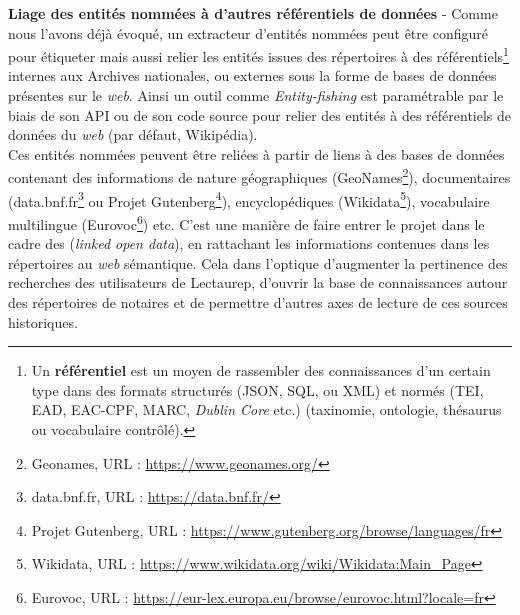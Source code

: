 \bigskip
\textbf{Liage des entités nommées à d'autres référentiels de données} - Comme nous l'avons déjà évoqué, un extracteur d'entités nommées peut être configuré pour étiqueter mais aussi relier les entités issues des répertoires à des référentiels\footnote{Un \textbf{référentiel} est un moyen de rassembler des connaissances d'un certain type dans des formats structurés (JSON, SQL, ou XML) et normés (TEI, EAD, EAC-CPF, MARC, \textit{Dublin Core} etc.) (taxinomie, ontologie, thésaurus ou vocabulaire contrôlé).} internes aux Archives nationales, ou externes sous la forme de bases de données présentes sur le \textit{web}. Ainsi un outil comme \textit{Entity-fishing} est paramétrable par le biais de son API ou de son code source pour relier des entités à des référentiels de données du \textit{web} (par défaut, Wikipédia).\\ 

Ces entités nommées peuvent être reliées à partir de liens à des bases de données contenant des informations de nature géographiques (GeoNames\footnote{Geonames, URL : \url{https://www.geonames.org/}}), documentaires (data.bnf.fr\footnote{data.bnf.fr, URL : \url{https://data.bnf.fr/}} ou Projet Gutenberg\footnote{Projet Gutenberg, URL : \url{https://www.gutenberg.org/browse/languages/fr}}), encyclopédiques (Wikidata\footnote{Wikidata, URL : \url{https://www.wikidata.org/wiki/Wikidata:Main_Page}}), vocabulaire multilingue (Eurovoc\footnote{Eurovoc, URL : \url{https://eur-lex.europa.eu/browse/eurovoc.html?locale=fr}}) etc. C'est une manière de faire entrer le projet dans le cadre des  (\textit{linked open data}), en rattachant les informations contenues dans les répertoires au \textit{web} sémantique. Cela dans l'optique d'augmenter la pertinence des recherches des utilisateurs de Lectaurep, d'ouvrir la base de connaissances autour des répertoires de notaires et de permettre d'autres axes de lecture de ces sources historiques.\\

